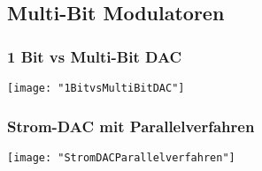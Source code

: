 
\subsection{Multi-Bit Modulatoren}


\subsubsection{1 Bit vs Multi-Bit DAC}
\begin{minipage}[t]{0.6\textwidth}
	\vspace{0pt}
	\texttt{[image: "1BitvsMultiBitDAC"]}
\end{minipage}\hspace{0.05\textwidth}
\begin{minipage}[t]{0.3\textwidth}
	\vspace{0pt}
	
\end{minipage}
\vspace{2mm}



\subsubsection{Strom-DAC mit Parallelverfahren}
\begin{minipage}[t]{0.3\textwidth}
	\vspace{0pt}
	\texttt{[image: "StromDACParallelverfahren"]}
\end{minipage}\hspace{0.05\textwidth}
\begin{minipage}[t]{0.3\textwidth}
	\vspace{0pt}
	
\end{minipage}\hspace{0.05\textwidth}
\begin{minipage}[t]{0.3\textwidth}
	\vspace{0pt}
	
\end{minipage}
\vspace{2mm}

